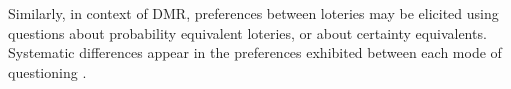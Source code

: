 \documentclass[french, english]{llncs}
\newcommand{\dollars}[1]{\SI{#1}[\$]{}}
\newcommand{\simplebet}[3]{(\dollars{#1}, #2; \dollars{#3})}
\begin{document}
	
	Similarly, in context of DMR, preferences between loteries may be elicited using questions about probability equivalent loteries, or about certainty equivalents. Systematic differences appear in the preferences exhibited between each mode of questioning \citep{luce_utility_2000}.
	
\end{document}
